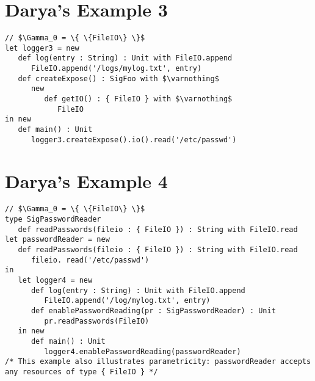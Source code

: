 \documentclass{llncs}
\begin{document}
\section{Darya's Example 3}
\vspace{-6pt}
\begin{lstlisting}[xleftmargin=20pt]
// $\Gamma_0 = \{ \{FileIO\} \}$
let logger3 = new
   def log(entry : String) : Unit with FileIO.append
      FileIO.append('/logs/mylog.txt', entry)
   def createExpose() : SigFoo with $\varnothing$
      new
         def getIO() : { FileIO } with $\varnothing$
            FileIO
in new
   def main() : Unit
      logger3.createExpose().io().read('/etc/passwd')
\end{lstlisting}


\section{Darya's Example 4}
\vspace{-6pt}
\begin{lstlisting}[xleftmargin=20pt]
// $\Gamma_0 = \{ \{FileIO\} \}$
type SigPasswordReader
   def readPasswords(fileio : { FileIO }) : String with FileIO.read
let passwordReader = new
   def readPasswords(fileio : { FileIO }) : String with FileIO.read
      fileio. read('/etc/passwd')
in
   let logger4 = new
      def log(entry : String) : Unit with FileIO.append
         FileIO.append('/log/mylog.txt', entry)
      def enablePasswordReading(pr : SigPasswordReader) : Unit
         pr.readPasswords(FileIO)
   in new
      def main() : Unit
         logger4.enablePasswordReading(passwordReader)
/* This example also illustrates parametricity: passwordReader accepts any resources of type { FileIO } */
\end{lstlisting}
\end{document}
